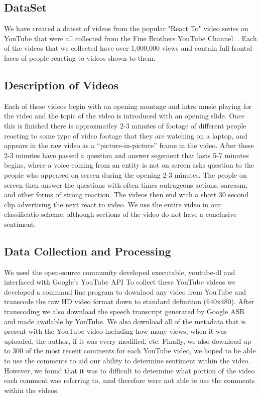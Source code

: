 \documentclass[twoside]{article}
\begin{document}
\begin{multicols}{2}

\section{DataSet}
We have created a datset of videos from the popular "React To" video series on YouTube that were all collected from the Fine Brothers YouTube Channel. \cite{FineBrothers}.
Each of the videos that we collected have over 1,000,000 views and contain full frontal faces of people reacting to videos shown to them.

\subsection{Description of Videos}
Each of these videos begin with an opening montage and intro music playing for the video and the topic of the video is introduced with an opening slide.
Once this is finished there is approxmatley 2-3 minutes of footage of different people reacting to some type of video footage that they are watching on a laptop, and appears in the raw video as a ``picture-in-picture'' frame in the video.
After these 2-3 minutes have passed a question and answer segement that lasts 5-7 minutes begins, where a voice coming from an entity is not on screen asks question to the people who appeared on screen during the opening 2-3 minutes.  
The people on screen then answer the questions with often times outrageous actions, sarcasm, and other forms of strong reaction.
The videos then end with a short 30 second clip advertising the next react to video.
We use the entire video in our classificatio scheme, although sections of the video do not have a conclusive sentiment.

\subsection{Data Collection and Processing}
We used the open-source community developed executable, youtube-dl \cite{youtubedl} and interfaced with Google's YouTube API  
To collect these YouTube videos we developed a command line program to downlaod any video from YouTube and transcode the raw HD video format down to standard definition (640x480).
After transcoding we also download the speech transcript generated by Google ASR and made available by YouTube.  
We also download all of the metadata that is present with the YouTube video including how many views, when it was uploaded, the author, if it was every modified, etc.
Finally, we also download up to 300 of the most recent comments for each YouTube video, we hoped to be able to use the comments to aid our ability to determine sentiment within the video.
However, we found that it was to difficult to determine what portion of the video each comment was referring to, amd therefore were not able to use the comments within the videos.


\end{multicols}
\end{document}
